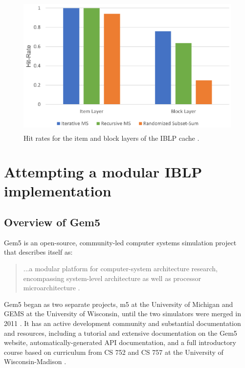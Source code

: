 \documentclass[12pt,twoside]{reedthesis}
\begin{document}
	\vfill

	\begin{figure}[H]
		\centering
		\includegraphics[height=2.8in]{figures/curtis_layer_hit_rates.png}
		\caption{Hit rates for the item and block layers of the IBLP cache \cite{curtis}.}
	\end{figure}

	\vfill

\chapter{Attempting a modular IBLP implementation}

\section{Overview of Gem5}

Gem5 is an open-source, community-led computer systems simulation project that describes itself as: \begin{quote}
	...a modular platform for computer-system architecture research, encompassing system-level architecture as well as processor microarchitecture \cite{gem5-about}.
\end{quote}

Gem5 began as two separate projects, m5 at the University of Michigan and GEMS at the University of Wisconsin, until the two simulators were merged in 2011 \cite{gem5-about}. It has an active development community and substantial documentation and resources, including a tutorial and extensive documentation on the Gem5 website, automatically-generated API documentation, and a full introductory course based on curriculum from CS 752 and CS 757 at the University of Wisconsin-Madison \cite{gem5-docs}.
\end{document}
